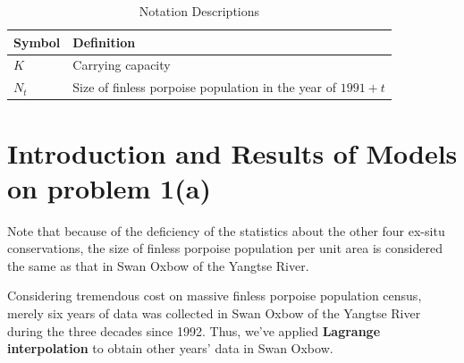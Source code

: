 \documentclass{mcmthesis}
\numberwithin{figure}{section}
\numberwithin{table}{section}
\numberwithin{equation}{section}
\begin{document}
\begin{table}[htpb!]
  \centering
  \caption{Notation Descriptions} \label{Notation}
  \begin{tabular}{m{2.5cm}<{\centering}|m{12.5cm}<{\centering}}
  \toprule[1.5pt]
  \textbf{Symbol} & \textbf{Definition} \\ \hline
   $ K $ & Carrying capacity \\ 
   $ N_t $ & Size of finless porpoise population in the year of $ 1991 + t $ \\ 
  \bottomrule[1.5pt]
  \end{tabular}
  \end{table}



\section{Introduction and Results of Models on problem 1(a)}

Note that because of the deficiency of the statistics about the other four ex-situ conservations,
the size of finless porpoise population per unit area is considered 
the same as that in Swan Oxbow of the Yangtse River.
\par
Considering tremendous cost on massive finless porpoise population 
census, merely six years of data was collected in Swan Oxbow of the Yangtse River
during the three decades since 1992. \citep{Liuzhigang}
Thus, we've applied \textbf{Lagrange interpolation} to obtain other years' data
in Swan Oxbow.
\end{document}
